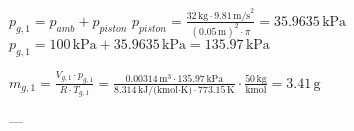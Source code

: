 \( p_{g,1} = p_{amb} + p_{piston} \)  
\( p_{piston} = \frac{32 \, \text{kg} \cdot 9.81 \, \text{m/s}^2}{(0.05 \, \text{m})^2 \cdot \pi} = 35.9635 \, \text{kPa} \)  
\( p_{g,1} = 100 \, \text{kPa} + 35.9635 \, \text{kPa} = 135.97 \, \text{kPa} \)  

\( m_{g,1} = \frac{V_{g,1} \cdot p_{g,1}}{R \cdot T_{g,1}} = \frac{0.00314 \, \text{m}^3 \cdot 135.97 \, \text{kPa}}{8.314 \, \text{kJ/(kmol·K)} \cdot 773.15 \, \text{K}} \cdot \frac{50 \, \text{kg}}{\text{kmol}} = 3.41 \, \text{g} \)  

---